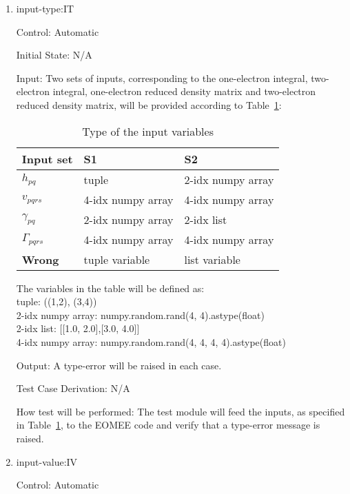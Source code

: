 \documentclass[12pt, titlepage]{article}
\begin{document}
\begin{enumerate}

\item{input-type:IT\\}

Control: Automatic
					
Initial State: N/A
					
Input: Two sets of inputs, corresponding to the one-electron integral, 
two-electron integral, one-electron reduced density matrix and two-electron 
reduced density matrix, will be provided according to 
Table~\ref{Table:typeerror}:

\begin{table}[h!]
	\centering
	\noindent \begin{tabular}{l l l } 
		\toprule		
		\textbf{Input set} & \textbf{S1} & \textbf{S2}\\
		\midrule 
		$h_{pq}$& tuple & 2-idx numpy array\\
		$v_{pqrs}$& 4-idx numpy array& 4-idx numpy array\\
		$\gamma_{pq}$& 2-idx numpy array& 2-idx list\\
		$\Gamma_{pqrs}$& 4-idx numpy array& 4-idx numpy array\\
		\textbf{Wrong}& tuple variable& list variable\\
		\bottomrule
	\end{tabular}
	\caption{Type of the input variables}
	\label{Table:typeerror}
\end{table}

The variables in the table will be defined as:\\
tuple: ((1,2), (3,4))\\
2-idx numpy array: numpy.random.rand(4, 4).astype(float)\\
2-idx list: [[1.0, 2.0],[3.0, 4.0]]\\
4-idx numpy array: numpy.random.rand(4, 4, 4, 4).astype(float)
	
Output: A type-error will be raised in each case. 

Test Case Derivation: N/A
					
How test will be performed: The test module will feed the inputs, as specified 
in Table~\ref{Table:typeerror}, to the EOMEE code and verify that a type-error 
message is raised.

					
\item{input-value:IV\\}

Control: Automatic
					

\end{enumerate}
\end{document}
